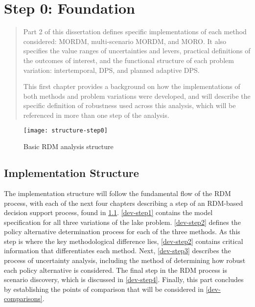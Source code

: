 \chapter{Step 0: Foundation} \label{dev-step0}

\begin{abstract}
    Part 2 of this dissertation defines specific implementations of each method considered: MORDM, multi-scenario MORDM, and MORO. It also specifies the value ranges of uncertainties and levers, practical definitions of the outcomes of interest, and the functional structure of each problem variation: intertemporal, DPS, and planned adaptive DPS. 
    
    This first chapter provides a background on how the implementations of both methods and problem variations were developed, and will describe the specific definition of robustness used across this analysis, which will be referenced in more than one step of the analysis.
\end{abstract}

\begin{figure}[h]
    \centering
    \captionsetup{justification=centering}
    
    \texttt{[image: structure-step0]}
    \caption{Basic RDM analysis structure}
    \label{fig:structure-step0}
\end{figure}

\newpage

\section{Implementation Structure}
The implementation structure will follow the fundamental flow of the RDM process, with each of the next four chapters describing a step of an RDM-based decision support process, found in \cref{fig:structure-step0}. \cref{dev-step1} contains the model specification for all three variations of the lake problem. \cref{dev-step2} defines the policy alternative determination process for each of the three methods. As this step is where the key methodological difference lies, \cref{dev-step2} contains critical information that differentiates each method. Next, \cref{dev-step3} describes the process of uncertainty analysis, including the method of determining how robust each policy alternative is considered. The final step in the RDM process is scenario discovery, which is discussed in \cref{dev-step4}. Finally, this part concludes by establishing the points of comparison that will be considered in \cref{dev-comparisons}.

